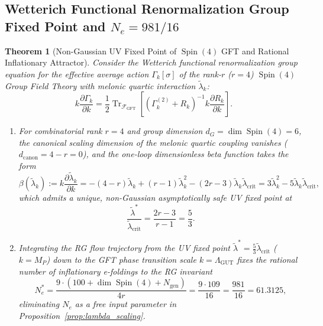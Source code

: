 \documentclass[11pt,a4paper]{article}
\theoremstyle{plain}
\newtheorem{theorem}{Theorem}[section]
\theoremstyle{definition}
\theoremstyle{remark}
\newcommand{\Tr}{\operatorname{Tr}}
\newcommand{\Spin}{\operatorname{Spin}}
\newcommand{\F}{\mathcal{F}}
\begin{document}
\subsection{Wetterich Functional Renormalization Group Fixed Point and $N_e = 981/16$}

\begin{theorem}[Non-Gaussian UV Fixed Point of $\Spin(4)$ GFT and Rational Inflationary Attractor]
\label{thm:wetterich}
Consider the Wetterich functional renormalization group equation for the effective average action $\Gamma_k[\sigma]$ of the rank-$r$ ($r=4$) $\Spin(4)$ Group Field Theory with melonic quartic interaction $\tilde{\lambda}_k$:
\begin{equation}
  k \frac{\partial \Gamma_k}{\partial k} = \frac{1}{2} \Tr_{\F_{\mathrm{GFT}}}\left[ \left( \Gamma_k^{(2)} + R_k \right)^{-1} k \frac{\partial R_k}{\partial k} \right].
\end{equation}
\begin{enumerate}[label=(\roman*)]
  \item For combinatorial rank $r = 4$ and group dimension $d_G = \dim\Spin(4) = 6$, the canonical scaling dimension of the melonic quartic coupling vanishes ($d_{\mathrm{canon}} = 4 - r = 0$), and the one-loop dimensionless beta function takes the form
  \begin{equation}
    \beta(\tilde{\lambda}_k) := k\frac{\partial \tilde{\lambda}_k}{\partial k} = -(4 - r)\tilde{\lambda}_k + (r - 1)\tilde{\lambda}_k^2 - (2r - 3)\tilde{\lambda}_k \tilde{\lambda}_{\mathrm{crit}} = 3\tilde{\lambda}_k^2 - 5\tilde{\lambda}_k\tilde{\lambda}_{\mathrm{crit}},
  \end{equation}
  which admits a unique, non-Gaussian asymptotically safe UV fixed point at
  \begin{equation}
    \frac{\tilde{\lambda}^*}{\tilde{\lambda}_{\mathrm{crit}}} = \frac{2r - 3}{r - 1} = \frac{5}{3}.
  \end{equation}
  \item Integrating the RG flow trajectory from the UV fixed point $\tilde{\lambda}^* = \frac{5}{3}\tilde{\lambda}_{\mathrm{crit}}$ ($k = M_P$) down to the GFT phase transition scale $k = \Lambda_{\mathrm{GUT}}$ fixes the rational number of inflationary e-foldings to the RG invariant
  \begin{equation}
    N_e^* = \frac{9 \cdot (100 + \dim\Spin(4) + N_{\mathrm{gen}})}{4 r} = \frac{9 \cdot 109}{16} = \frac{981}{16} = 61.3125,
  \end{equation}
  eliminating $N_e$ as a free input parameter in Proposition~\ref{prop:lambda_scaling}.
\end{enumerate}
\end{theorem}
\end{document}
